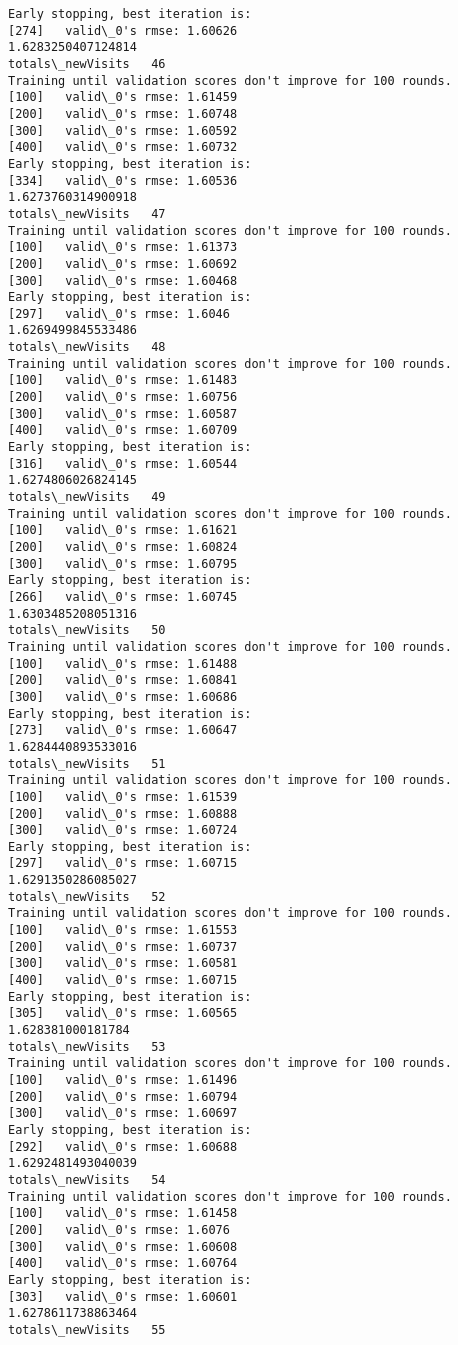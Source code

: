 \documentclass[11pt]{article}
\begin{document}
\begin{Verbatim}[commandchars=\\\{\}]
Early stopping, best iteration is:
[274]	valid\_0's rmse: 1.60626
1.6283250407124814
totals\_newVisits   46
Training until validation scores don't improve for 100 rounds.
[100]	valid\_0's rmse: 1.61459
[200]	valid\_0's rmse: 1.60748
[300]	valid\_0's rmse: 1.60592
[400]	valid\_0's rmse: 1.60732
Early stopping, best iteration is:
[334]	valid\_0's rmse: 1.60536
1.6273760314900918
totals\_newVisits   47
Training until validation scores don't improve for 100 rounds.
[100]	valid\_0's rmse: 1.61373
[200]	valid\_0's rmse: 1.60692
[300]	valid\_0's rmse: 1.60468
Early stopping, best iteration is:
[297]	valid\_0's rmse: 1.6046
1.6269499845533486
totals\_newVisits   48
Training until validation scores don't improve for 100 rounds.
[100]	valid\_0's rmse: 1.61483
[200]	valid\_0's rmse: 1.60756
[300]	valid\_0's rmse: 1.60587
[400]	valid\_0's rmse: 1.60709
Early stopping, best iteration is:
[316]	valid\_0's rmse: 1.60544
1.6274806026824145
totals\_newVisits   49
Training until validation scores don't improve for 100 rounds.
[100]	valid\_0's rmse: 1.61621
[200]	valid\_0's rmse: 1.60824
[300]	valid\_0's rmse: 1.60795
Early stopping, best iteration is:
[266]	valid\_0's rmse: 1.60745
1.6303485208051316
totals\_newVisits   50
Training until validation scores don't improve for 100 rounds.
[100]	valid\_0's rmse: 1.61488
[200]	valid\_0's rmse: 1.60841
[300]	valid\_0's rmse: 1.60686
Early stopping, best iteration is:
[273]	valid\_0's rmse: 1.60647
1.6284440893533016
totals\_newVisits   51
Training until validation scores don't improve for 100 rounds.
[100]	valid\_0's rmse: 1.61539
[200]	valid\_0's rmse: 1.60888
[300]	valid\_0's rmse: 1.60724
Early stopping, best iteration is:
[297]	valid\_0's rmse: 1.60715
1.6291350286085027
totals\_newVisits   52
Training until validation scores don't improve for 100 rounds.
[100]	valid\_0's rmse: 1.61553
[200]	valid\_0's rmse: 1.60737
[300]	valid\_0's rmse: 1.60581
[400]	valid\_0's rmse: 1.60715
Early stopping, best iteration is:
[305]	valid\_0's rmse: 1.60565
1.628381000181784
totals\_newVisits   53
Training until validation scores don't improve for 100 rounds.
[100]	valid\_0's rmse: 1.61496
[200]	valid\_0's rmse: 1.60794
[300]	valid\_0's rmse: 1.60697
Early stopping, best iteration is:
[292]	valid\_0's rmse: 1.60688
1.6292481493040039
totals\_newVisits   54
Training until validation scores don't improve for 100 rounds.
[100]	valid\_0's rmse: 1.61458
[200]	valid\_0's rmse: 1.6076
[300]	valid\_0's rmse: 1.60608
[400]	valid\_0's rmse: 1.60764
Early stopping, best iteration is:
[303]	valid\_0's rmse: 1.60601
1.6278611738863464
totals\_newVisits   55

\end{Verbatim}
\end{document}
